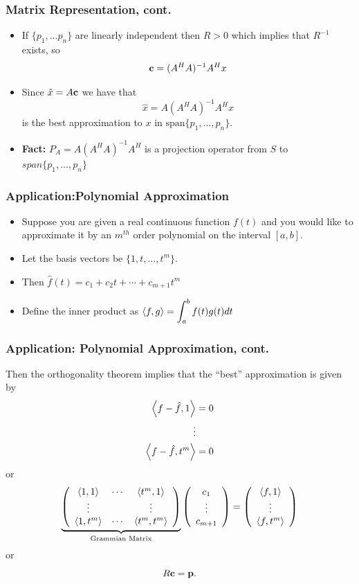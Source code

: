 \documentclass{beamer}
\begin{document}
\begin{frame}\frametitle{Matrix Representation, cont.}
	\begin{itemize}	
	\item If $\{p_1, \ldots p_n\}$ are linearly independent then $R > 0$ which implies that $R^{-1}$ exists, so
	\[ \mathbf{c} = (A^HA)^{-1}A^Hx \]

	\item Since $\hat{x} = A\mathbf{c}$ we have that
	\[
	\hat{x} = A (A^H A)^{-1} A^H x
	\]
	is the best approximation to $x$ in $\text{span}\{p_1, \dots, p_n\}$.
	
	\item {\bf Fact:}  $P_A = A(A^HA)^{-1}A^H$ is a projection operator from $S$ to $span\{p_1,\ldots,p_n\}$
	\end{itemize}
\end{frame}

\begin{frame}\frametitle{Application:Polynomial Approximation}
	\begin{itemize}
	\item Suppose you are given a real continuous function $f(t)$ and you would like to approximate it by an $m^{th}$ order polynomial on the interval $[a,b]$.
	\item Let the basis vectors be $\{1,t,\ldots,t^m\}$.
	\item Then $\hat{f}(t) = c_1 + c_2t + \cdots + c_{m+1} t^m$
	\item Define the inner product as $\left< f,g\right> = \displaystyle
	\int_{a}^{b} f(t)g(t) dt$
	\end{itemize}
\end{frame}

\begin{frame}\frametitle{Application: Polynomial Approximation, cont.}	
	
	Then the orthogonality theorem implies that the ``best'' approximation is
	given by 
	\begin{align*}
	\left< f - \hat{f}, 1\right> &= 0\\
	\vdots\\
	\left< f - \hat{f}, t^m \right> &= 0
	\end{align*}
	or
	\[
	\underbrace{
		\left( \begin{array}{ccc}
		\left< 1,1 \right> & \cdots & \left< t^m, 1\right>\\
		\vdots & & \vdots \\
		\left< 1,t^m\right> & \cdots & \left< t^m, t^m \right>
		\end{array}
		\right)}_{\text{ Grammian Matrix }}
	\left(
	\begin{array}{c}
	c_1\\
	\vdots\\
	c_{m+1}
	\end{array}
	\right)
	=
	\left( \begin{array}{c}
	\left< f,1 \right>\\
	\vdots\\
	\left< f, t^m \right>
	\end{array}
	\right)
	\]	
	or
	\[ R \mathbf{c} = \mathbf{p}.  \]
\end{frame}
\end{document}
